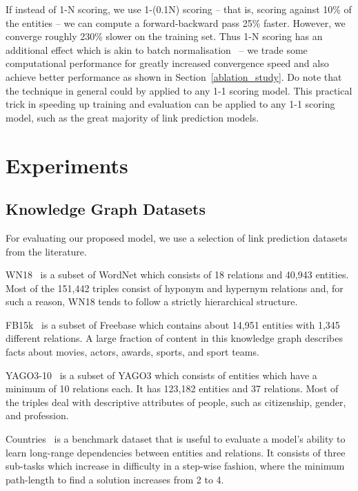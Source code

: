 \documentclass[letterpaper]{article}
\newcommand{\citep}{\cite}
\begin{document}
If instead of 1-N scoring, we use 1-(0.1N) scoring -- that is, scoring against 10\% of the entities -- we can compute a forward-backward pass 25\% faster.
However, we converge roughly 230\% slower on the training set.
Thus 1-N scoring has an additional effect which is akin to batch normalisation~\citep{ioffe2015batch} -- we trade some computational performance for greatly increased convergence speed and also achieve better performance as shown in Section~\ref{ablation_study}.
Do note that the technique in general could by applied to any 1-1 scoring model.
This practical trick in speeding up training and evaluation can be applied to any 1-1 scoring model, such as the great majority of link prediction models.


\section{Experiments}
\label{Experiments}
\subsection{Knowledge Graph Datasets}

For evaluating our proposed model, we use a selection of link prediction datasets from the literature.


WN18~\citep{DBLP:conf/nips/BordesUGWY13} is a subset of WordNet which consists of 18 relations and 40,943 entities.
Most of the 151,442 triples consist of hyponym and hypernym relations and, for such a reason, WN18 tends to follow a strictly hierarchical structure. 


FB15k~\citep{DBLP:conf/nips/BordesUGWY13} is a subset of Freebase which contains about 14,951 entities with 1,345 different relations.
A large fraction of content in this knowledge graph describes facts about movies, actors, awards, sports, and sport teams. 


YAGO3-10~\citep{DBLP:conf/cidr/MahdisoltaniBS15} is a subset of YAGO3 which consists of entities which have a minimum of 10 relations each.
It has 123,182 entities and 37 relations.
Most of the triples deal with descriptive attributes of people, such as citizenship, gender, and profession.


Countries~\citep{bouchard2015approximate} is a benchmark dataset that is useful to evaluate a model's ability to learn long-range dependencies between entities and relations.
It consists of three sub-tasks which increase in difficulty in a step-wise fashion, where the minimum path-length to find a solution increases from 2 to 4.
\end{document}
